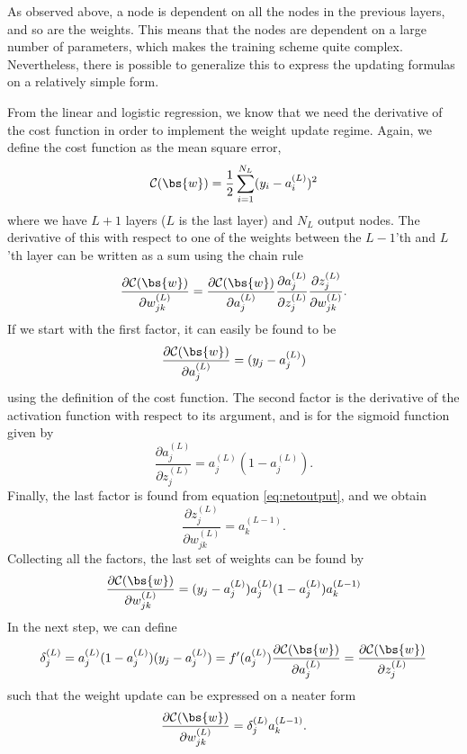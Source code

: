 As observed above, a node is dependent on all the nodes in the previous layers, and so are the weights. This means that the nodes are dependent on a large number of parameters, which makes the training scheme quite complex. Nevertheless, there is possible to generalize this to express the updating formulas on a relatively simple form.

From the linear and logistic regression, we know that we need the derivative of the cost function in order to implement the weight update regime. Again, we define the cost function as the mean square error,
\begin{equation*}
\mathcal{C}(\bs{w})=\frac{1}{2}\sum_{i=1}^{N_L}(y_i-a_i^{(L)})^2
\end{equation*}
where we have $L+1$ layers ($L$ is the last layer) and $N_L$ output nodes. The derivative of this with respect to one of the weights between the $L-1$'th and $L$'th layer can be written as a sum using the chain rule
\begin{equation*}
\frac{\partial\mathcal{C}(\bs{w})}{\partial w_{jk}^{(L)}}=\frac{\partial\mathcal{C}(\bs{w})}{\partial a_j^{(L)}}\frac{\partial a_j^{(L)}}{\partial z_j^{(L)}}\frac{\partial z_j^{(L)}}{\partial w_{jk}^{(L)}}.
\end{equation*}
If we start with the first factor, it can easily be found to be 
\begin{equation*}
\frac{\partial\mathcal{C}(\bs{w})}{\partial a_j^{(L)}}=(y_j-a_j^{(L)})
\end{equation*}
using the definition of the cost function. The second factor is the derivative of the activation function with respect to its argument, and is for the sigmoid function given by
\begin{equation*}
\frac{\partial a_j^{(L)}}{\partial z_j^{(L)}}=a_j^{(L)}(1-a_j^{(L)}).
\end{equation*}
Finally, the last factor is found from equation \eqref{eq:netoutput}, and we obtain
\begin{equation*}
\frac{\partial z_j^{(L)}}{\partial w_{jk}^{(L)}}=a_k^{(L-1)}.
\end{equation*}
Collecting all the factors, the last set of weights can be found by
\begin{equation*}
\frac{\partial\mathcal{C}(\bs{w})}{\partial w_{jk}^{(L)}}=(y_j-a_j^{(L)})a_j^{(L)}(1-a_j^{(L)})a_k^{(L-1)}
\end{equation*}
In the next step, we can define
\begin{equation*}
\delta_j^{(L)}=a_j^{(L)}(1-a_j^{(L)})(y_j-a_j^{(L)})=f'(a_j^{(L)})\frac{\partial \mathcal{C}(\bs{w})}{\partial a_j^{(L)}}=\frac{\partial \mathcal{C}(\bs{w})}{\partial z_j^{(L)}}
\end{equation*}
such that the weight update can be expressed on a neater form
\begin{equation*}
\frac{\partial\mathcal{C}(\bs{w})}{\partial w_{jk}^{(L)}}=\delta_j^{(L)}a_k^{(L-1)}.
\end{equation*}


